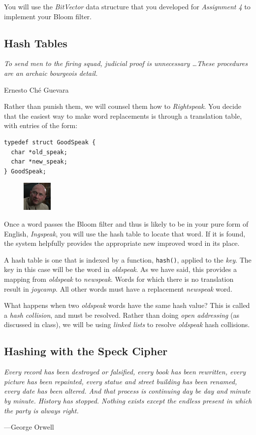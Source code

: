 \documentclass{article}
\begin{document}
You will use the \emph{BitVector} data structure that you developed
for \emph{Assignment 4} to implement your Bloom filter.

\subsection{Hash Tables}
\epigraph{\emph{To send men to the firing squad, judicial proof is unnecessary
\ldots These procedures are an archaic bourgeois detail.}}{Ernesto Ch\'e Guevara}
\noindent
Rather than punish them, we will counsel them how to \emph{Rightspeak}. You
decide that the easiest way to make word replacements is through a translation
table, with entries of the form:

\lstset{language=C, style=c99}
\begin{lstlisting}[title=\texttt{GoodSpeak struct}]
typedef struct GoodSpeak {
  char *old_speak;
  char *new_speak;
} GoodSpeak;
\end{lstlisting}

\begin{figure}
\centering
\includegraphics[width=0.130\textwidth]{Blofeld.png}
\end{figure}
Once a word passes the Bloom filter and thus is likely to be in
your pure form of English, \emph{Ingspeak}, you will use the hash
table to locate that word. If it is found, the system
helpfully provides the appropriate new improved word in its place.

A hash table is one that is indexed by a function, \texttt{hash()}, applied to
the \emph{key}. The key in this case will be the word in \emph{oldspeak}.  As we
have said, this provides a mapping from \emph{oldspeak} to \emph{newspeak}.
Words for which there is no translation result in \emph{joycamp}.  All other
words must have a replacement \emph{newspeak} word.

What happens when two \emph{oldspeak} words have the same hash value? This is
called a \emph{hash collision}, and must be resolved. Rather than doing
\emph{open addressing} (as discussed in class), we will be using \emph{linked
lists} to resolve \emph{oldspeak} hash collisions.

\subsection{Hashing with the Speck Cipher}
\epigraph{\emph{Every record has been destroyed or falsified, every book has
been rewritten, every picture has been repainted, every statue and street
building has been renamed, every date has been altered. And that process is
continuing day be day and minute by minute. History has stopped. Nothing
exists except the endless present in which the party is always
right.}}{---George Orwell}
\end{document}
